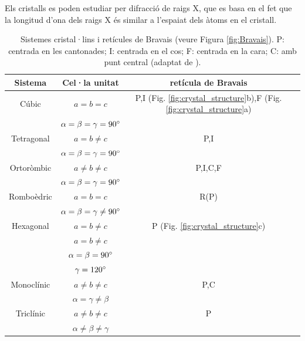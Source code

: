 Els cristalls es poden estudiar per difracció de raigs X, que es basa en el fet que la longitud d'ona dels raigs X és similar a l'espaiat dels àtoms en el cristall. 

\begin{table}[h!]
  \begin{center}
    \caption[Sistemes cristal·lins i retícules de Bravais]{Sistemes cristal·lins i retícules de Bravais (veure Figura \ref{fig:Bravais}). P: centrada en les cantonades; I: centrada en el cos; F: centrada en la cara; C: amb punt central (adaptat de \cite{yen_chemistry_2008}).}
    \label{tab:Bravais}
    \begin{tabular}{cccc}
      \hline
      Sistema & Cel·la unitat & retícula de Bravais \\ 
      \hline
	  Cúbic      & $a=b=c$ & P,I (Fig. \ref{fig:crystal_structure}b),F (Fig. \ref{fig:crystal_structure}a)\\
	             & $\alpha=\beta=\gamma=90\degree$ & \\
	  Tetragonal & $a=b\neq c$ & P,I \\
	             & $\alpha=\beta=\gamma=90\degree$ & \\
	  Ortoròmbic & $a\neq b\neq c$ & P,I,C,F\\
	             & $\alpha=\beta=\gamma=90\degree$ & \\
	  Romboèdric & $a=b=c$ & R(P)\\
	             & $\alpha=\beta=\gamma \neq 90\degree$ & \\
	  Hexagonal  & $a=b\neq c$ & P (Fig. \ref{fig:crystal_structure}c) \\
	             & $a=b \neq c$ & \\
	             & $\alpha = \beta = 90 \degree$ & \\
	             & $\gamma = 120\degree$ &\\
	  Monoclínic & $a \neq b \neq c$ & P,C\\
	             & $\alpha=\gamma \neq \beta$&\\
	  Triclínic  & $a \neq b \neq c$ & P\\
	             & $\alpha \neq \beta \neq \gamma$&\\
      \hline
    \end{tabular}
  \end{center}
\end{table}


